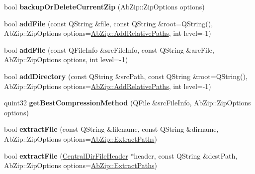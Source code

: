 \begin{DoxyCompactItemize}
\item 
bool {\bfseries backup\+Or\+Delete\+Current\+Zip} (Ab\+Zip\+::\+Zip\+Options options)\hypertarget{class_ab_zip_private_ad4766b24f751ccd174e3980222b750cd}{}\label{class_ab_zip_private_ad4766b24f751ccd174e3980222b750cd}

\item 
bool {\bfseries add\+File} (const Q\+String \&file, const Q\+String \&root=Q\+String(), Ab\+Zip\+::\+Zip\+Options options=\hyperlink{class_ab_zip_a9c4f57d6b8d9a449c2eb6c4d4e53c9d5a9fe2234f7fddcfdae76f8aeb8c3c2d44}{Ab\+Zip\+::\+Add\+Relative\+Paths}, int level=-\/1)\hypertarget{class_ab_zip_private_a7a73c686a3eb43a0464f4dda7ba3395d}{}\label{class_ab_zip_private_a7a73c686a3eb43a0464f4dda7ba3395d}

\item 
bool {\bfseries add\+File} (const Q\+File\+Info \&src\+File\+Info, const Q\+String \&arc\+File, Ab\+Zip\+::\+Zip\+Options options, int level=-\/1)\hypertarget{class_ab_zip_private_a8daee9e359ace4960db292f042834265}{}\label{class_ab_zip_private_a8daee9e359ace4960db292f042834265}

\item 
bool {\bfseries add\+Directory} (const Q\+String \&src\+Path, const Q\+String \&root=Q\+String(), Ab\+Zip\+::\+Zip\+Options options=\hyperlink{class_ab_zip_a9c4f57d6b8d9a449c2eb6c4d4e53c9d5a9fe2234f7fddcfdae76f8aeb8c3c2d44}{Ab\+Zip\+::\+Add\+Relative\+Paths}, int level=-\/1)\hypertarget{class_ab_zip_private_a59e04950ffdaa41d0f9f86273423aabb}{}\label{class_ab_zip_private_a59e04950ffdaa41d0f9f86273423aabb}

\item 
quint32 {\bfseries get\+Best\+Compression\+Method} (Q\+File \&src\+File\+Info, Ab\+Zip\+::\+Zip\+Options options)\hypertarget{class_ab_zip_private_a777df1bb1757b194966140a828976b6f}{}\label{class_ab_zip_private_a777df1bb1757b194966140a828976b6f}

\item 
bool {\bfseries extract\+File} (const Q\+String \&filename, const Q\+String \&dirname, Ab\+Zip\+::\+Zip\+Options options=\hyperlink{class_ab_zip_a9c4f57d6b8d9a449c2eb6c4d4e53c9d5a5fbbad9051dbd556f6c66ecb88bb7633}{Ab\+Zip\+::\+Extract\+Paths})\hypertarget{class_ab_zip_private_aac5149eb6cdf6774238c622d7f6bfcf6}{}\label{class_ab_zip_private_aac5149eb6cdf6774238c622d7f6bfcf6}

\item 
bool {\bfseries extract\+File} (\hyperlink{class_central_dir_file_header}{Central\+Dir\+File\+Header} $\ast$header, const Q\+String \&dest\+Path, Ab\+Zip\+::\+Zip\+Options options=\hyperlink{class_ab_zip_a9c4f57d6b8d9a449c2eb6c4d4e53c9d5a5fbbad9051dbd556f6c66ecb88bb7633}{Ab\+Zip\+::\+Extract\+Paths})\hypertarget{class_ab_zip_private_ac7839b9f51569a004e6bd3a3c59813ea}{}\label{class_ab_zip_private_ac7839b9f51569a004e6bd3a3c59813ea}


\end{DoxyCompactItemize}

